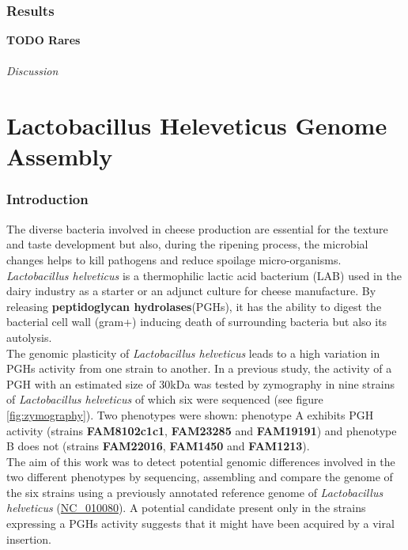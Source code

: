 \documentclass[10pt,a4paper]{article}
\begin{document}
\section*{Results} \textbf{TODO Rares}

\paragraph{Discussion}


\newpage
\part*{Lactobacillus Heleveticus Genome Assembly}
\section*{Introduction}




The diverse bacteria involved in cheese production are essential for the texture and taste development but also, during the ripening process, the microbial changes helps to kill pathogens and reduce spoilage micro-organisms. \textit{Lactobacillus helveticus} is a thermophilic lactic acid bacterium (LAB) used in the dairy industry as a starter or an adjunct culture for cheese manufacture\cite{jebava_nine_2011}. By releasing \textbf{peptidoglycan hydrolases}(PGHs), it has the ability to digest the bacterial cell wall (gram+) inducing death of surrounding bacteria but also its autolysis. \\

The genomic plasticity of \textit{Lactobacillus helveticus} leads to a high variation in PGHs activity from one strain to another. In a previous study, the activity of a PGH with an estimated size of 30kDa was tested by zymography in nine strains of \textit{Lactobacillus helveticus} of which six were sequenced (see figure \ref{fig:zymography}). Two phenotypes were shown: phenotype A exhibits PGH activity (strains \textbf{FAM8102c1c1}, \textbf{FAM23285} and \textbf{FAM19191}) and phenotype B does not (strains \textbf{FAM22016}, \textbf{FAM1450} and \textbf{FAM1213}).\\

The aim of this work was to detect potential genomic differences involved in the two different phenotypes by sequencing, assembling and compare the genome of the six strains using a previously annotated reference genome of \textit{Lactobacillus helveticus} (\href{https://www.ncbi.nlm.nih.gov/genome/?term=NC_010080}{NC\_010080}). A potential candidate present only in the strains expressing a PGHs activity suggests that it might have been acquired by a viral insertion. 
\end{document}
